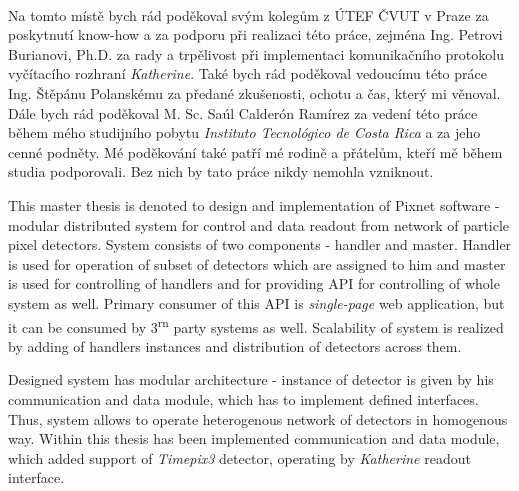 \documentclass[11pt,twoside,a4paper]{book}
\begin{document}
	\translate				%


	\coverpagestarts

	\newpage~
	
	
	\newpage

	\acknowledgements
	\noindent
	Na tomto místě bych rád poděkoval svým kolegům z ÚTEF ČVUT v Praze za poskytnutí know-how a za podporu při realizaci této práce, zejména Ing. Petrovi Burianovi, Ph.D. za rady a trpělivost při implementaci komunikačního protokolu vyčítacího rozhraní \textit{Katherine}. Také bych rád poděkoval vedoucímu této práce Ing. Štěpánu Polanskému za předané zkušenosti, ochotu a čas, který mi věnoval. Dále bych rád poděkoval M. Sc. Saúl Calderón Ramírez za vedení této práce během mého studijního pobytu \textit{Instituto Tecnológico de Costa Rica} a za jeho cenné podněty. Mé poděkování také patří mé rodině a přátelům, kteří mě během studia podporovali. Bez nich by tato práce nikdy nemohla vzniknout.





 
	\abstractpage
	This master thesis is denoted to design and implementation of Pixnet software - modular distributed system for control and data readout from network of particle pixel detectors. System consists of two components - handler and master. Handler is used for operation of subset of detectors which are assigned to him and master is used for controlling of handlers and for providing API for controlling of whole system as well. Primary consumer of this API is \textit{single-page} web application, but it can be consumed by 3\textsuperscript{rn} party systems as well. Scalability of system is realized by adding of handlers instances and distribution of detectors across them.

	Designed system has modular architecture - instance of detector is given by his communication and data module, which has to implement defined interfaces. Thus, system allows to operate heterogenous network of detectors in homogenous way. Within this thesis has been implemented communication and data module, which added support of \textit{Timepix3} detector, operating by \textit{Katherine} readout interface.
\end{document}
